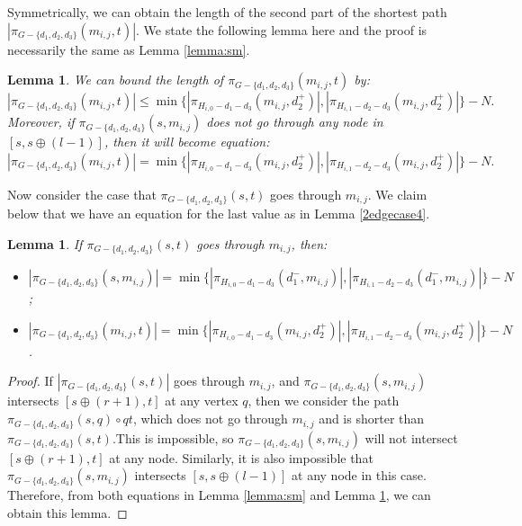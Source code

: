 \documentclass[11pt]{article}
\theoremstyle{plain}
\newtheorem{lemma}[theorem]{Lemma}
\theoremstyle{definition}
\newcommand{\set}[1]{\{ #1 \}}
\newcommand{\og}[3]{\pi_{G-#3}\left(#1,#2\right)}
\begin{document}
Symmetrically, we can obtain the length of the second part of the shortest path $|\og{m_{i,j}}{t}{\set{d_1, d_2, d_3}}|$. We state the following lemma here and the proof is necessarily the same as Lemma \ref{lemma:sm}.

\begin{lemma}\label{lemma:mt}
    We can bound the length of $\og{m_{i,j}}{t}{\set{d_1, d_2, d_3}}$ by:
    \[|\og{m_{i,j}}{t}{\set{d_1, d_2, d_3}}| {\leq} \min \{ |\pi_{H_{i,0}-d_1-d_3}(m_{i,j},d_2^+)|,|\pi_{H_{i,1}-d_2-d_3}(m_{i,j},d_2^+)| \} -N.\]
    Moreover, if $\og{s}{m_{i,j}}{\set{d_1, d_2, d_3}}$ {does not go through any node in $[s, s \oplus (l-1)]$}, then it will become equation:
    \[|\og{m_{i,j}}{t}{\set{d_1, d_2, d_3}}| = \min \{ |\pi_{H_{i,0}-d_1-d_3}(m_{i,j},d_2^+)|,|\pi_{H_{i,1}-d_2-d_3}(m_{i,j},d_2^+)| \} -N.\]
\end{lemma}

Now consider the case that $\og{s}{t}{\set{d_1, d_2, d_3}}$ goes through $m_{i,j}$. We claim below that we have an equation for the last value as in Lemma \ref{2edgecase4}.

\begin{lemma}\label{lemma:2edgescase4-2}
    If $\og{s}{t}{\set{d_1, d_2, d_3}}$ goes through $m_{i,j}$, then:
    \begin{itemize}
    \item $|\og{s}{m_{i,j}}{\set{d_1, d_2, d_3}}| = \min \{ |\pi_{H_{i,0}-d_1-d_3}(d_1^-,m_{i,j})|,|\pi_{H_{i,1}-d_2-d_3}(d_1^-,m_{i,j})| \} -N$;
    \item $|\og{m_{i,j}}{t}{\set{d_1, d_2, d_3}}| = \min \{ |\pi_{H_{i,0}-d_1-d_3}(m_{i,j},d_2^+)|,|\pi_{H_{i,1}-d_2-d_3}(m_{i,j},d_2^+)| \} -N$.
\end{itemize}
\end{lemma}


\begin{proof}
If $|\og{s}{t}{\set{d_1, d_2, d_3}}|$ goes through $m_{i,j}$, and $\og{s}{m_{i,j}}{\set{d_1, d_2, d_3}}$ intersects $[s\oplus (r+1),t]$ at any vertex $q$, then we consider the path $\og{s}{q}{\set{d_1, d_2, d_3}} \circ qt$, which does not go through $m_{i,j}$ and is shorter than $\og{s}{t}{\set{d_1, d_2, d_3}}$.This is impossible, so $\og{s}{m_{i,j}}{\set{d_1, d_2, d_3}}$ will not intersect $[s\oplus (r+1),t]$ at any node. Similarly, it is also impossible that $\og{s}{m_{i,j}}{\set{d_1, d_2, d_3}}$ intersects $[s, s \oplus (l-1)]$ at any node in this case. Therefore, from both equations in Lemma \ref{lemma:sm} and Lemma \ref{lemma:mt}, we can obtain this lemma.
\end{proof}
\end{document}
